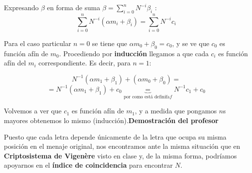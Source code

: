 \begin{problem}[2]
Expresando $β$ en forma de suma $β = \sum_{i=0}^n N^{-i}β_i$ :
\[\sum_{i=0}^n N^{-i}(α m_i + β_i) = \sum_{i=0}^n N^{-i}c_i\]

Para el caso particular $n=0$ se tiene que $αm_0 + β_0 = c_0$, y se ve que $c_0$ es función afín de $m_0$. Procediendo por \textbf{inducción} llegamos a que cada $c_i$ es función afín del $m_i$ correspondiente. Es decir, para $n=1$:

\[ N^{-1}(αm_1+β_1) + (αm_0+β_0) =\]
\[= N^{-1}(αm_1 +β_1) + c_0 \underbrace{=}_{\text{por como está definifa} f} N^{-1}c_1+c_0\]

Volvemos a ver que $c_1$ es función afín de $m_1$, y a medida que pongamos $n$s mayores obtenemos lo mismo (inducción).\textbf{Demostración del profesor}

\spart
Puesto que cada letra depende únicamente de la letra que ocupa su misma posición en el menaje original, nos encontramos ante la misma situación que en \textbf{Criptosistema de Vigenère} visto en clase y, de la misma forma, podríamos apoyarnos en el \textbf{índice de coincidencia} para encontrar $N$.
\end{problem}

